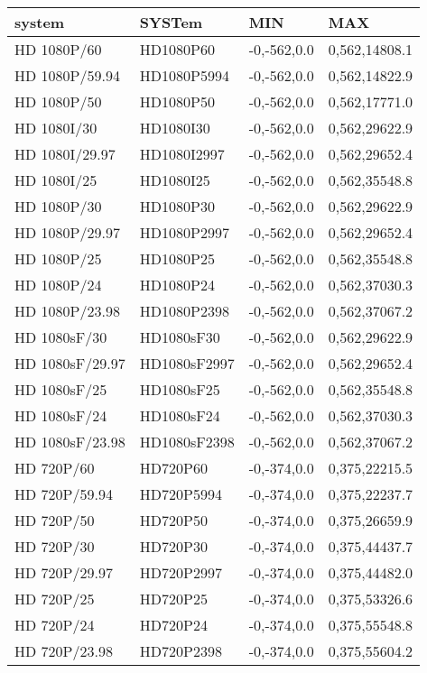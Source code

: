 \begin{tabular}{|l|l|l|l|}
\hline
system      &       SYSTem    &      MIN     &        MAX \\ \hline
HD 1080P/60     &   HD1080P60   & -0,-562,0.0 & 0,562,14808.1\\ \hline
HD 1080P/59.94  &   HD1080P5994 & -0,-562,0.0 & 0,562,14822.9\\ \hline
HD 1080P/50     &   HD1080P50   & -0,-562,0.0 & 0,562,17771.0\\ \hline
HD 1080I/30     &   HD1080I30   & -0,-562,0.0 & 0,562,29622.9\\ \hline
HD 1080I/29.97  &   HD1080I2997 & -0,-562,0.0 & 0,562,29652.4\\ \hline
HD 1080I/25     &   HD1080I25   & -0,-562,0.0 & 0,562,35548.8\\ \hline
HD 1080P/30     &   HD1080P30   & -0,-562,0.0 & 0,562,29622.9\\ \hline
HD 1080P/29.97  &   HD1080P2997 & -0,-562,0.0 & 0,562,29652.4\\ \hline
HD 1080P/25     &   HD1080P25   & -0,-562,0.0 & 0,562,35548.8\\ \hline
HD 1080P/24     &   HD1080P24   & -0,-562,0.0 & 0,562,37030.3\\ \hline
HD 1080P/23.98  &   HD1080P2398 & -0,-562,0.0 & 0,562,37067.2\\ \hline
HD 1080sF/30    &   HD1080sF30  & -0,-562,0.0 & 0,562,29622.9\\ \hline
HD 1080sF/29.97 &   HD1080sF2997& -0,-562,0.0 & 0,562,29652.4\\ \hline
HD 1080sF/25    &   HD1080sF25  & -0,-562,0.0 & 0,562,35548.8\\ \hline
HD 1080sF/24    &   HD1080sF24  & -0,-562,0.0 & 0,562,37030.3\\ \hline
HD 1080sF/23.98 &   HD1080sF2398& -0,-562,0.0 & 0,562,37067.2\\ \hline
HD 720P/60      &   HD720P60    & -0,-374,0.0 & 0,375,22215.5\\ \hline
HD 720P/59.94   &   HD720P5994  & -0,-374,0.0 & 0,375,22237.7\\ \hline
HD 720P/50      &   HD720P50    & -0,-374,0.0 & 0,375,26659.9\\ \hline
HD 720P/30      &   HD720P30    & -0,-374,0.0 & 0,375,44437.7\\ \hline
HD 720P/29.97   &   HD720P2997  & -0,-374,0.0 & 0,375,44482.0\\ \hline
HD 720P/25      &   HD720P25    & -0,-374,0.0 & 0,375,53326.6\\ \hline
HD 720P/24      &   HD720P24    & -0,-374,0.0 & 0,375,55548.8\\ \hline
HD 720P/23.98   &   HD720P2398  & -0,-374,0.0 & 0,375,55604.2\\ \hline
\end{tabular}


